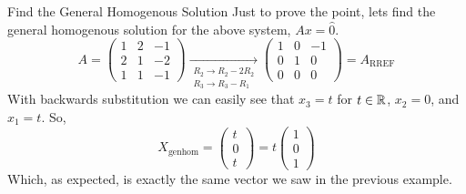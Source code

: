 \begin{example}{Find the General Homogenous Solution}{}
    Just to prove the point, lets find the general homogenous solution for the above system, $Ax = \hat{0}$. 
    \[A = \begin{pmatrix}
        1 & 2 & -1 \\
        2 & 1 & -2 \\
        1 & 1 & -1
    \end{pmatrix}
    \xrightarrow[\substack{R_2 \to R_2 - 2R_2 \\ R_3 \to R_3 - R_1}]{} 
    \begin{pmatrix}
        1 & 0 & -1 \\
        0 & 1 & 0 \\
        0 & 0 & 0
    \end{pmatrix} = A_{\text{RREF}} 
    \]
    With backwards substitution we can easily see that $x_3=t$ for $t \in \mathbb R$, $x_2=0$, and $x_1 = t$. So, 
    \[X_{\text{genhom}} = \begin{pmatrix}
        t \\ 0 \\ t
    \end{pmatrix} = t\begin{pmatrix}
        1 \\ 0 \\ 1
    \end{pmatrix}\]
    Which, as expected, is exactly the same vector we saw in the previous example.
\end{example}

